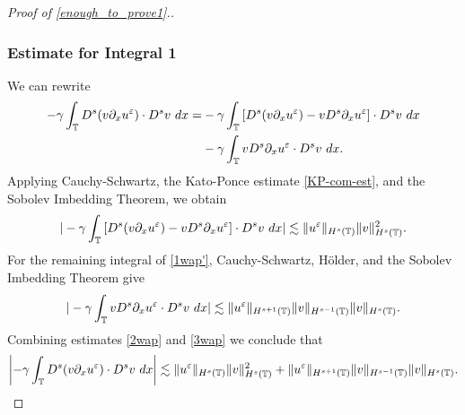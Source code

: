 \begin{proof}[Proof of \eqref{enough_to_prove1}.]
\subsubsection{Estimate for Integral 1} We can rewrite
%
%
\begin{equation}
\begin{split}
-\gamma \int_{\mathbb{T}} D^s (v \partial_x u^\varepsilon ) \cdot D^s v \
dx = & -\gamma \int_{\mathbb{T}} \left[ D^s(v \partial_x u^\varepsilon) - v D^s
\partial_x u^\varepsilon \right] \cdot D^s v \ dx
\\
& -  \gamma \int_{\mathbb{T}} v D^s \partial_x u^\varepsilon \cdot D^s v \ dx.
\label{1wap'}
\end{split}
\end{equation}
%
%
%
%
%
%
Applying Cauchy-Schwartz, the Kato-Ponce estimate \eqref{KP-com-est}, and the Sobolev 
Imbedding Theorem, we obtain 
%
%
%
%
\begin{equation}
\begin{split}
| -\gamma \int_{\mathbb{T}} \left[ D^s(v \partial_x u^\varepsilon ) - v D^s
\partial_x u^\varepsilon \right] \cdot D^s v \ dx |
\lesssim \|u^\varepsilon \|_{H^s(\mathbb{T})} \|v\|_{H^s(\mathbb{T})}^2.
\label{2wap}
\end{split}
\end{equation}
%
%
For the remaining integral of \eqref{1wap'}, Cauchy-Schwartz, H\"older, and the Sobolev 
Imbedding Theorem give
%
%
%
\begin{equation}
\begin{split}
  | - \gamma \int_{\mathbb{T}} v D^s \partial_x u^{\varepsilon} \cdot D^s v \ dx |
\lesssim \|u^\varepsilon \|_{H^{s+1}(\mathbb{T})} \|v\|_{H^{s-1}(\mathbb{T})}
\|v\|_{H^s(\mathbb{T})}.
\label{3wap}
\end{split}
\end{equation}
%
%
Combining estimates \eqref{2wap} and \eqref{3wap} we conclude that
%
%
\begin{equation}
\begin{split}
\left | -\gamma \int_{\mathbb{T}} D^s (v \partial_x u^\varepsilon ) \cdot D^s v \
dx \right | \lesssim \|u^\varepsilon \|_{H^s(\mathbb{T})} \|v\|_{H^s(\mathbb{T})}^2 + \|u^\varepsilon 
\|_{H^{s+1}(\mathbb{T})} \|v\|_{H^{s-1}(\mathbb{T})}
\|v\|_{H^s(\mathbb{T})}.
\label{4wap}
\end{split}
\end{equation}
%
%
%

\end{proof}
